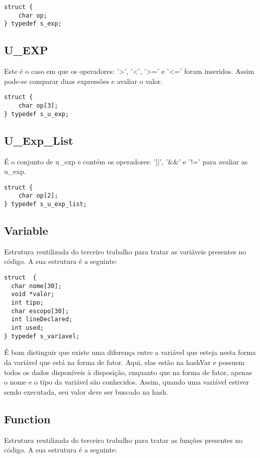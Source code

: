 \documentclass[a4paper,10pt]{article}
\begin{document}
\begin{lstlisting}
struct {
	char op;
} typedef s_exp;
\end{lstlisting}

\subsection{U\_EXP}

Este é o caso em que os operadores: '>', '<', '>=' e '<=' foram inseridos. Assim pode-se comparar duas expressões e avaliar o valor.

\begin{lstlisting}
struct {
	char op[3];
} typedef s_u_exp;
\end{lstlisting}

\subsection{U\_Exp\_List}

É o conjunto de u\_exp e contém os operadores: '||', '\&\&' e '!=' para avaliar as u\_exp.

\begin{lstlisting}
struct {
	char op[2];
} typedef s_u_exp_list;
\end{lstlisting}

\subsection{Variable}

Estrutura reutilizada do terceiro trabalho para tratar as variáveis presentes no código. A sua estrutura é a seguinte:

\begin{lstlisting}
struct  {
  char nome[30];
  void *valor;
  int tipo;
  char escopo[30];
  int lineDeclared;
  int used;
} typedef s_variavel;
\end{lstlisting}
É bom distinguir que existe uma diferença entre a variável que esteja nesta forma da variável que está na forma de fator. Aqui, elas estão na
hashVar e possuem todos os dados disponíveis à disposição, enquanto que na forma de fator, apenas o nome e o tipo da variável são conhecidos. Assim,
quando uma variável estiver sendo executada, seu valor deve ser buscado na hash.
\subsection{Function}

Estrutura reutilizada do terceiro trabalho para tratar as funções presentes no código. A sua estrutura é a seguinte:
\end{document}
